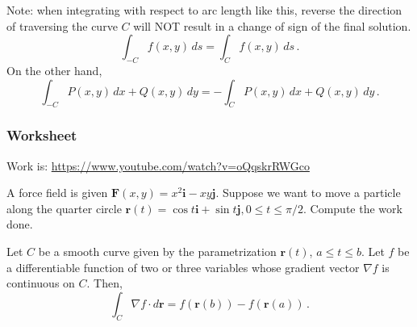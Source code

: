 \documentclass[aspectratio=169]{beamer}
\newcommand{\vect}{\mathbf}
\begin{document}
\begin{frame}
Note: when integrating with respect to arc length like this, reverse the direction of traversing the curve \(C\) will NOT result
in a change of sign of the final solution.
\begin{equation*}
    \int_{-C} f(x,y) \, ds =  \int_C f(x,y) \, ds \,.
\end{equation*}
On the other hand,
\begin{equation*}
\int_{-C} P(x,y) \, dx + Q(x,y) \, dy 
= -\int_C P(x,y) \, dx + Q(x,y) \, dy \,.
\end{equation*}
\end{frame}
\begin{frame}
    \frametitle{Worksheet}
    Work is: \url{https://www.youtube.com/watch?v=oQqskrRWGco}

    A force field is given $\vect{F}(x,y) = x^2 \vect{i} - xy \vect{j}$.
    Suppose we want to move a particle along the quarter circle
    $\vect{r}(t) = \cos t \vect{i} + \sin t \vect{j}, 0 \leq t \leq \pi/2$.
    Compute the work done.
\end{frame}


\begin{frame}
\begin{theorem}
Let \(C\) be a smooth curve given by the parametrization \(\mathbf{r}(t)\),
\(a \leq t \leq b\).
Let \(f\) be a differentiable function of two or three
variables whose gradient vector \(\nabla f\) is continuous on \(C\).
Then,
\begin{equation*}
    \int_C \nabla f \cdot d\mathbf{r} = f(\mathbf{r}(b)) - f(\mathbf{r}(a)) \,.
\end{equation*}
\end{theorem}
\end{frame}
\end{document}

